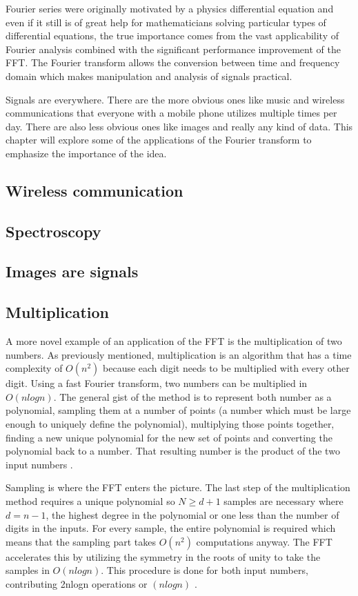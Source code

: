 Fourier series were originally motivated by a physics differential equation and even if it still is of great help for mathematicians solving particular types of differential equations, the true importance comes from the vast applicability of Fourier analysis combined with the significant performance improvement of the FFT. The Fourier transform allows the conversion between time and frequency domain which makes manipulation and analysis of signals practical. 

Signals are everywhere. There are the more obvious ones like music and wireless communications that everyone with a mobile phone utilizes multiple times per day. There are also less obvious ones like images and really any kind of data. This chapter will explore some of the applications of the Fourier transform to emphasize the importance of the idea.

\subsection{Wireless communication}

\subsection{Spectroscopy}

\subsection{Images are signals}

\subsection{Multiplication}
A more novel example of an application of the FFT is the multiplication of two numbers. As previously mentioned, multiplication is an algorithm that has a time complexity of $O(n^2)$ because each digit needs to be multiplied with every other digit. Using a fast Fourier transform, two numbers can be multiplied in $O(nlogn)$. The general gist of the method is to represent both number as a polynomial, sampling them at a number of points (a number which must be large enough to uniquely define the polynomial), multiplying those points together, finding a new unique polynomial for the new set of points and converting the polynomial back to a number. That resulting number is the product of the two input numbers \cite{Reducible2020}.

Sampling is where the FFT enters the picture. The last step of the multiplication method requires a unique polynomial so $N \geq d+1$ samples are necessary where $d = n-1$, the highest degree in the polynomial or one less than the number of digits in the inputs. For every sample, the entire polynomial is required which means that the sampling part takes $O(n^2)$ computations anyway. The FFT accelerates this by utilizing the symmetry in the roots of unity to take the samples in $O(nlogn)$. This procedure is done for both input numbers, contributing 2nlogn operations or $(nlogn)$ \cite{Reducible2020}.

